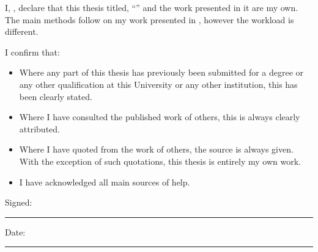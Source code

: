 
\begin{declaration}

\noindent I, \authorname, declare that this thesis titled, \enquote{\ttitle} and the work presented in it are my own. The main methods follow on my work presented in \citep{bulin_2016}, however the workload is different.

I confirm that:

\begin{itemize} 
\item Where any part of this thesis has previously been submitted for a degree or any other qualification at this University or any other institution, this has been clearly stated.
\item Where I have consulted the published work of others, this is always clearly attributed.
\item Where I have quoted from the work of others, the source is always given. With the exception of such quotations, this thesis is entirely my own work.
\item I have acknowledged all main sources of help.
\end{itemize}
 
\noindent Signed:\\
\rule[0.5em]{25em}{0.5pt} %
 
\noindent Date:\\
\rule[0.5em]{25em}{0.5pt} %
\end{declaration}

\cleardoublepage